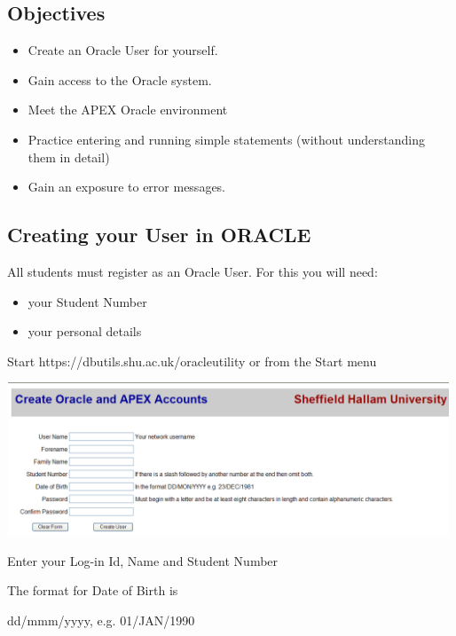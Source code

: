\subsection{Objectives}
\begin{itemize}
\item Create an Oracle User for yourself.
\item Gain access to the Oracle system.
\item Meet the APEX Oracle environment 
\item Practice entering and running simple statements (without understanding them in detail)
\item Gain an exposure to error messages.
\end{itemize}
\subsection{Creating your User in ORACLE }
All students must register as an Oracle User.  For this you will need:

\begin{itemize}
\item your Student Number
\item your personal details
\end{itemize}
Start https://dbutils.shu.ac.uk/oracleutility  or from the Start menu



\begin{center}
  
\includegraphics[width=13.201cm,height=4.574cm]{images/img (3).png}

\end{center}
\begin{center}
\begin{minipage}{4.177cm}
Enter your Log-in Id, Name and Student Number
\end{minipage}
\end{center}


\begin{center}
\begin{minipage}{4.177cm}
The format for Date of Birth is

dd/mmm/yyyy, e.g. 01/JAN/1990
\end{minipage}
\end{center}



